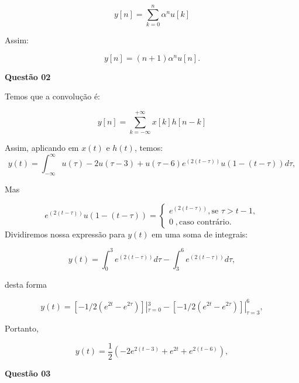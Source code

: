 \begin{equation}
    y[n] = \sum_{k = 0} ^n \alpha ^n u[k] 
\end{equation}

Assim:

\begin{equation}
    y[n] = (n + 1)\alpha^n u[n].
\end{equation}

\textbf{Questão 02}

Temos que a convolução é:

\begin{equation}
    y[n] = \sum ^{+\infty} _{k = -\infty} x[k]h[n - k]
\end{equation}

Assim, aplicando em $x(t)$ e $h(t)$, temos:
\begin{equation}
    y(t) = \int _{-\infty} ^{\infty} u(\tau) - 2u(\tau - 3) + u(\tau - 6) e^{(2(t - \tau))}u(1- (t - \tau)) d\tau,
\end{equation}

Mas

\begin{equation}
    e^{(2(t - \tau))}u(1 - (t - \tau)) = \begin{cases}
        e^{(2(t- \tau))}, \text{se } \tau > t-1 , \\
        0 \;, \text{caso contrário.}
    \end{cases}
\end{equation}
Dividiremos nossa expressão para $y(t)$ em uma soma de integrais:

\begin{equation}
    y(t) = \int _{0} ^3 e^{(2(t - \tau))} d\tau - \int_{3} ^6 e^{(2(t - \tau))}d\tau,
\end{equation}

desta forma

\begin{equation}
    y(t) = \left[ -1/2 (e^{2t} - e^{2\tau})\right]|_{\tau = 0} ^3 - \left[ -1/2 (e^{2t} - e^{2\tau})\right]|_{\tau = 3} ^6, 
\end{equation}

Portanto,

\begin{equation}
    y(t) = \frac{1}{2}(-2 e^{2(t-3)} + e^{2t} + e^{2(t-6)}),
\end{equation}



\newpage

\textbf{Questão 03} 

